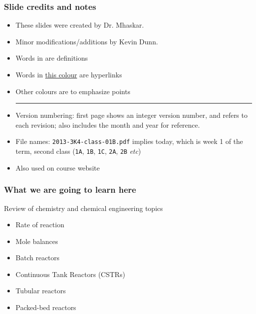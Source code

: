 \begin{frame}\frametitle{Slide credits and notes}
	\begin{itemize}
		\item	These slides were created by Dr. Mhaskar.
		\item	Minor modifications/additions by Kevin Dunn.
	\end{itemize}

	\vspace{6pt}
	\begin{itemize}
		\item	Words in {\color{purple}{purple}} are definitions
		\item	Words in \href{http://learnche.mcmaster.ca/3K4}{this colour} are hyperlinks
		\item	Other colours are to emphasize points
		\vspace{6pt}
		\hrule
		\vspace{6pt}
		\item	Version numbering: first page shows an integer version number, and refers to each revision; also includes the month and year for reference.
		\item	File names: \texttt{2013-3K4-class-01B.pdf} implies today, which is week 1 of the term, second class (\texttt{1A}, \texttt{1B}, \texttt{1C}, \texttt{2A}, \texttt{2B} \emph{etc})
		\item	Also used on course website
	\end{itemize}
\end{frame}

\begin{frame}\frametitle{What we are going to learn here}
	Review of chemistry and chemical engineering topics
	\begin{itemize}
		\item	Rate of reaction
		\item	Mole balances
		\item	Batch reactors
		\item	Continuous Tank Reactors (CSTRs)
		\item	Tubular reactors
		\item	Packed-bed reactors
	\end{itemize}
\end{frame}

